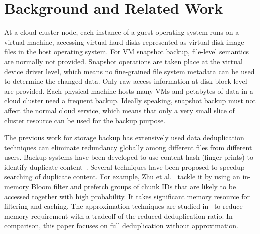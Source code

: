 
\section{Background and Related Work}
\label{sect:background}




At a cloud cluster node, each instance of a guest operating system runs on a virtual machine, accessing virtual hard disks 
represented as virtual disk image files in the host operating system.
For VM snapshot backup, file-level semantics are normally not provided.
Snapshot operations are taken place at the virtual device driver level, which means no fine-grained file system metadata can be used to determine the changed data. Only raw access information at disk block level are provided. 
Each physical machine hosts many VMs and petabytes of data in a cloud cluster need a frequent  backup. 
Ideally speaking, snapshot backup must not affect the normal cloud service, which means that 
only a very small slice of cluster resource can be used for the backup purpose.


The previous work for storage backup has extensively used  data deduplication techniques can eliminate redundancy globally among different files from different users.
Backup systems have been developed to use content hash (finger prints) to identify duplicate
content~\cite{venti02,Rhea2008}.
Several techniques have been proposed to speedup searching of duplicate
content. For example,
Zhu et al.~\cite{bottleneck08} tackle it
by using an in-memory Bloom filter and prefetch groups of chunk IDs that are likely to be
accessed together with high probability. It takes significant memory resource for filtering and caching.
The approximation techniques are studied in~\cite{extreme_binning09,WeiZhangIEEE}  
to reduce memory requirement with a tradeoff of the reduced deduplication ratio.
In comparison, this paper focuses on  full deduplication without approximation.

